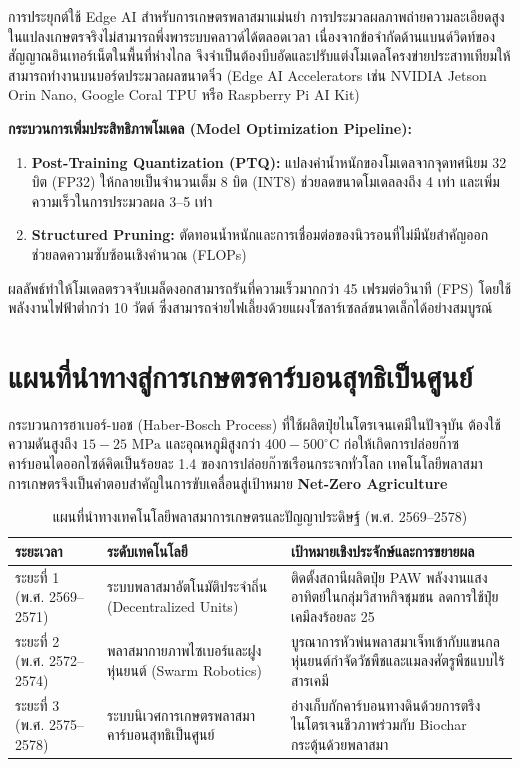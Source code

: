 \begin{aibox}{การประยุกต์ใช้ Edge AI สำหรับการเกษตรพลาสมาแม่นยำ}
การประมวลผลภาพถ่ายความละเอียดสูงในแปลงเกษตรจริงไม่สามารถพึ่งพาระบบคลาวด์ได้ตลอดเวลา เนื่องจากข้อจำกัดด้านแบนด์วิดท์ของสัญญาณอินเทอร์เน็ตในพื้นที่ห่างไกล จึงจำเป็นต้องบีบอัดและปรับแต่งโมเดลโครงข่ายประสาทเทียมให้สามารถทำงานบนบอร์ดประมวลผลขนาดจิ๋ว (Edge AI Accelerators เช่น NVIDIA Jetson Orin Nano, Google Coral TPU หรือ Raspberry Pi AI Kit)

\textbf{กระบวนการเพิ่มประสิทธิภาพโมเดล (Model Optimization Pipeline):}
\begin{enumerate}
    \item \textbf{Post-Training Quantization (PTQ):} แปลงค่าน้ำหนักของโมเดลจากจุดทศนิยม 32 บิต (FP32) ให้กลายเป็นจำนวนเต็ม 8 บิต (INT8) ช่วยลดขนาดโมเดลลงถึง 4 เท่า และเพิ่มความเร็วในการประมวลผล 3--5 เท่า
    \item \textbf{Structured Pruning:} ตัดทอนน้ำหนักและการเชื่อมต่อของนิวรอนที่ไม่มีนัยสำคัญออก ช่วยลดความซับซ้อนเชิงคำนวณ (FLOPs)
\end{enumerate}
ผลลัพธ์ทำให้โมเดลตรวจจับเมล็ดงอกสามารถรันที่ความเร็วมากกว่า 45 เฟรมต่อวินาที (FPS) โดยใช้พลังงานไฟฟ้าต่ำกว่า 10 วัตต์ ซึ่งสามารถจ่ายไฟเลี้ยงด้วยแผงโซลาร์เซลล์ขนาดเล็กได้อย่างสมบูรณ์
\end{aibox}

\section{แผนที่นำทางสู่การเกษตรคาร์บอนสุทธิเป็นศูนย์}

กระบวนการฮาเบอร์-บอช (Haber-Bosch Process) ที่ใช้ผลิตปุ๋ยไนโตรเจนเคมีในปัจจุบัน ต้องใช้ความดันสูงถึง $15 - 25\text{ MPa}$ และอุณหภูมิสูงกว่า $400 - 500^\circ\text{C}$ ก่อให้เกิดการปล่อยก๊าซคาร์บอนไดออกไซด์คิดเป็นร้อยละ 1.4 ของการปล่อยก๊าซเรือนกระจกทั่วโลก เทคโนโลยีพลาสมาการเกษตรจึงเป็นคำตอบสำคัญในการขับเคลื่อนสู่เป้าหมาย \textbf{Net-Zero Agriculture}

\begin{table}[H]
\caption{แผนที่นำทางเทคโนโลยีพลาสมาการเกษตรและปัญญาประดิษฐ์ (พ.ศ. 2569--2578)}
\label{tab:plasma_roadmap}
\begin{tabularx}{\textwidth}{p{2.6cm} p{3.2cm} X}
\toprule
\textbf{ระยะเวลา} & \textbf{ระดับเทคโนโลยี} & \textbf{เป้าหมายเชิงประจักษ์และการขยายผล} \\
\midrule
ระยะที่ 1 (พ.ศ. 2569--2571) & ระบบพลาสมาอัตโนมัติประจำถิ่น (Decentralized Units) & ติดตั้งสถานีผลิตปุ๋ย PAW พลังงานแสงอาทิตย์ในกลุ่มวิสาหกิจชุมชน ลดการใช้ปุ๋ยเคมีลงร้อยละ 25 \\
ระยะที่ 2 (พ.ศ. 2572--2574) & พลาสมากายภาพไซเบอร์และฝูงหุ่นยนต์ (Swarm Robotics) & บูรณาการหัวพ่นพลาสมาเจ็ทเข้ากับแขนกลหุ่นยนต์กำจัดวัชพืชและแมลงศัตรูพืชแบบไร้สารเคมี \\
ระยะที่ 3 (พ.ศ. 2575--2578) & ระบบนิเวศการเกษตรพลาสมาคาร์บอนสุทธิเป็นศูนย์ & อ่างเก็บกักคาร์บอนทางดินด้วยการตรึงไนโตรเจนชีวภาพร่วมกับ Biochar กระตุ้นด้วยพลาสมา \\
\bottomrule
\end{tabularx}
\end{table}

